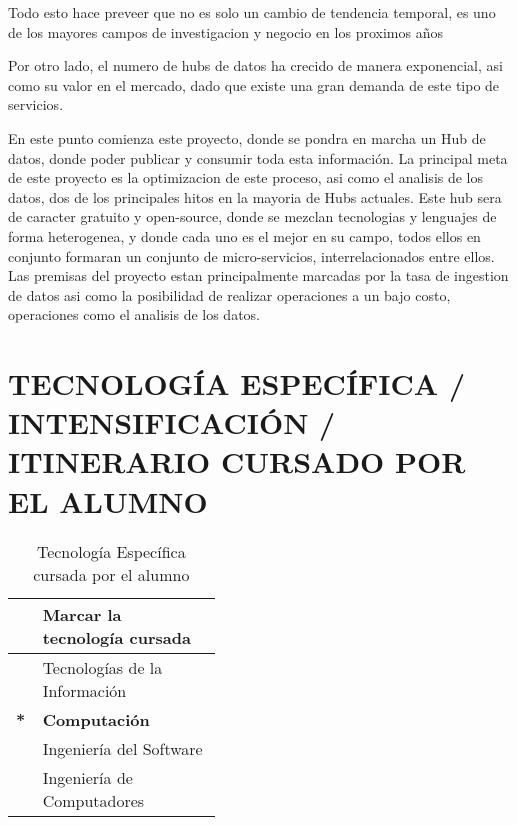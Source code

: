 \documentclass{pre-tfg}
\begin{document}
Todo esto hace preveer que no es solo un cambio de tendencia temporal,
es uno de los mayores campos de investigacion y negocio en los
proximos años

Por otro lado, el numero de hubs de datos ha crecido de manera
exponencial, asi como su valor en el mercado, dado que existe una gran
demanda de este tipo de servicios.


En este punto comienza este proyecto, donde se pondra en marcha un Hub de datos, donde poder publicar y consumir toda esta información. La
principal meta de este proyecto es la optimizacion de este proceso, asi como el analisis de los datos, dos de los principales hitos en la
mayoria de Hubs actuales. Este hub sera de caracter gratuito y open-source, donde se mezclan tecnologias y lenguajes de forma
heterogenea, y donde cada uno es el mejor en su campo, todos ellos en conjunto formaran un conjunto de micro-servicios, interrelacionados
entre ellos. Las premisas del proyecto estan principalmente marcadas
por la tasa de ingestion de datos asi como la posibilidad de realizar
operaciones a un bajo costo, operaciones como el analisis de
los datos.


\section{TECNOLOGÍA ESPECÍFICA / INTENSIFICACIÓN / ITINERARIO CURSADO POR EL ALUMNO}

\begin{table}[hp]
  \centering
  \caption{Tecnología Específica cursada por el alumno}
  \label{tab:tec-especifica}

  \begin{tabular}{p{0.01\linewidth}p{0.4\linewidth}}
    &\textbf{Marcar la tecnología cursada} \\
    \hline
    & Tecnologías de la Información \\
    \textbf{*} &\textbf{Computación} \\
    &Ingeniería del Software \\
    &Ingeniería de Computadores \\
    \hline
  \end{tabular}
\end{table}
\end{document}
